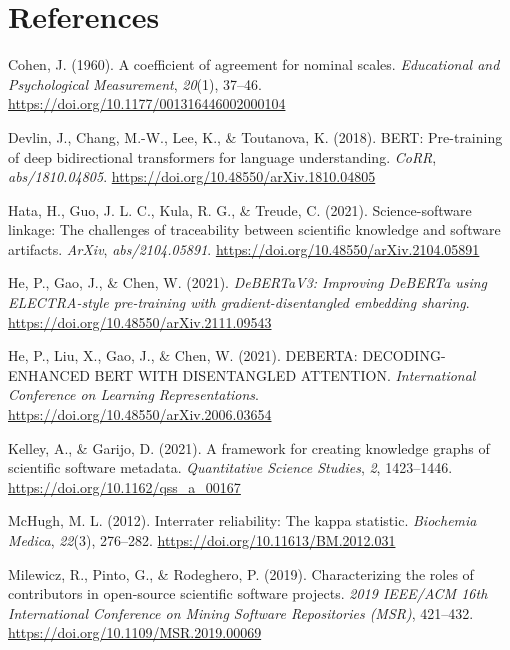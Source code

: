 \documentclass[
  letterpaper,
  DIV=11,
  numbers=noendperiod]{scrartcl}
\newlength{\cslhangindent}
\newenvironment{CSLReferences}[2] %
 {\begin{list}{}{%
  \setlength{\itemindent}{0pt}
  \setlength{\leftmargin}{0pt}
  \setlength{\parsep}{0pt}
  \ifodd #1
   \setlength{\leftmargin}{\cslhangindent}
   \setlength{\itemindent}{-1\cslhangindent}
  \fi
  \setlength{\itemsep}{#2\baselineskip}}}
 {\end{list}}
\begin{document}
\section*{References}\label{references}

\label{refs}
\begin{CSLReferences}{1}{0}
Cohen, J. (1960). A coefficient of agreement for nominal scales.
\emph{Educational and Psychological Measurement}, \emph{20}(1), 37--46.
\url{https://doi.org/10.1177/001316446002000104}

Devlin, J., Chang, M.-W., Lee, K., \& Toutanova, K. (2018). {BERT:}
Pre-training of deep bidirectional transformers for language
understanding. \emph{CoRR}, \emph{abs/1810.04805}.
\url{https://doi.org/10.48550/arXiv.1810.04805}

Hata, H., Guo, J. L. C., Kula, R. G., \& Treude, C. (2021).
Science-software linkage: The challenges of traceability between
scientific knowledge and software artifacts. \emph{ArXiv},
\emph{abs/2104.05891}. \url{https://doi.org/10.48550/arXiv.2104.05891}

He, P., Gao, J., \& Chen, W. (2021). \emph{DeBERTaV3: Improving DeBERTa
using ELECTRA-style pre-training with gradient-disentangled embedding
sharing}. \url{https://doi.org/10.48550/arXiv.2111.09543}

He, P., Liu, X., Gao, J., \& Chen, W. (2021). DEBERTA: DECODING-ENHANCED
BERT WITH DISENTANGLED ATTENTION. \emph{International Conference on
Learning Representations}.
\url{https://doi.org/10.48550/arXiv.2006.03654}

Kelley, A., \& Garijo, D. (2021). A framework for creating knowledge
graphs of scientific software metadata. \emph{Quantitative Science
Studies}, \emph{2}, 1423--1446.
\url{https://doi.org/10.1162/qss_a_00167}

McHugh, M. L. (2012). Interrater reliability: The kappa statistic.
\emph{Biochemia Medica}, \emph{22}(3), 276--282.
\url{https://doi.org/10.11613/BM.2012.031}

Milewicz, R., Pinto, G., \& Rodeghero, P. (2019). Characterizing the
roles of contributors in open-source scientific software projects.
\emph{2019 IEEE/ACM 16th International Conference on Mining Software
Repositories (MSR)}, 421--432.
\url{https://doi.org/10.1109/MSR.2019.00069}


\end{CSLReferences}
\end{document}

